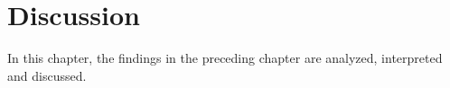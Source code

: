 \chapter{Discussion}

In this chapter, the findings in the preceding chapter are analyzed, interpreted and discussed. 